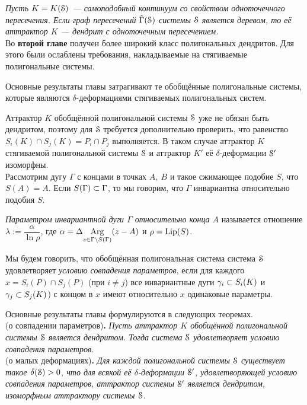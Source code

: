 {\em Пусть $K=K({\EuScript S})$ --- самоподобный континуум со свойством одноточечного пересечения.
Если граф пересечений $\hat\Gamma({\EuScript S})$ системы ${\EuScript S}$ является деревом, то её аттрактор $K$ --- дендрит с одноточечным пересечением.}\\


Во \textbf{второй главе} получен более широкий класс полигональных дендритов.
Для этого были ослаблены требования, накладываемые на стягиваемые полигональные системы.


Основные результаты главы затрагивают те обобщённые полигональные системы, которые являются $\delta$-деформациями стягиваемых полигональных систем.


Аттрактор $K$ обобщённой полигональной системы ${\EuScript S}$ уже не обязан быть дендритом, поэтому для ${\EuScript S}$ требуется дополнительно проверить, что равенство $S_i(K)\cap S_j(K)=P_i\cap P_j$ выполняется.
В таком случае аттрактор $K$ стягиваемой полигональной системы ${\EuScript S}$ и аттрактор $K'$ её $\delta$-деформации ${\EuScript S}'$ изоморфны.\\

Рассмотрим дугу $\Gamma$ с концами в точках $A,\ B$ и такое сжимающее подобие $S$, что $S(A)=A$.
Если $S(\Gamma)\subset\Gamma$, то мы говорим, что $\Gamma$ инвариантна относительно подобия $S$.

{\em Параметром инвариантной дуги $\Gamma$ относительно конца $A$} называется отношение $\lambda:=\dfrac{\alpha}{\ln\rho}$, где $\alpha=\Delta\underset{{z\in\Gamma\setminus S(\Gamma)}}{\mathrm {Arg}}(z-A)$ и $\rho=\mathop{\rm Lip} \nolimits(S)$.

Мы будем говорить, что обобщённая полигональная система система ${\EuScript S}$ удовлетворяет {\em условию совпадения параметров}, если для каждого \linebreak $x=S_i(P)\cap S_j(P)$ (при $i\neq j$) все инвариантные дуги $\gamma_i\subset S_i(K)$ и $\gamma_j\subset S_j(K)$) с концом в $x$ имеют относительно $x$ одинаковые параметры.

Основные результаты главы формулируются в следующих теоремах.\\

 (о совпадении параметров){\bf.}
{\em
Пусть аттрактор $K$ обобщённой полигональной системы ${\EuScript S}$ является дендритом.
Тогда система ${\EuScript S}$ удовлетворяет условию совпадения параметров.}\\

 (о малых деформациях){\bf.}
{\em Для каждой полигональной системы ${\EuScript S}$ существует такое $\delta({\EuScript S}) > 0$, что для всякой её $\delta$-деформации ${\EuScript S}'$, удовлетворяющей условию совпадения параметров, аттрактор системы ${\EuScript S}'$ является дендритом, изоморфным аттрактору системы ${\EuScript S}$.}\\


